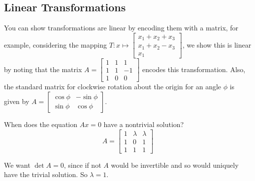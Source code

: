 \subsection{Linear Transformations}
\begin{example}
    You can show transformations are linear by encoding them with a matrix, for example, considering the mapping $T\colon x\mapsto 
    \begin{bmatrix}
        x_1+x_2+x_3\\
        x_1+x_2-x_3\\
        x_1
    \end{bmatrix}$, we show this is linear by noting that the matrix $A=
    \begin{bmatrix}
        1 & 1 & 1 \\
        1 & 1 & -1\\
        1 & 0 & 0
    \end{bmatrix}$ encodes this transformation. Also, the standard matrix for clockwise rotation about the origin for an angle $\phi $ is given by $A=
\begin{bmatrix}
    \cos \phi & -\sin \phi\\
    \sin \phi & \cos \phi
\end{bmatrix}$.
\end{example}
\begin{prob}
    When does the equation $Ax=0$ have a nontrivial solution? \[
    A=\begin{bmatrix}
        1 & \lambda & \lambda \\
        1 & 0 & 1\\
        1 & 1 & 1 
    \end{bmatrix}
    \] 
\end{prob}
\begin{solution}
    We want $\det A=0$, since if not $A$ would be invertible and so would uniquely have the trivial solution. So $\lambda=1$.
\end{solution}

